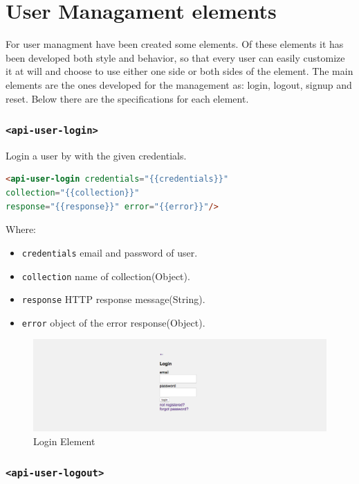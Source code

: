 \section{User Managament elements}

For user managment have been created some elements.
Of these elements it has been developed both style and behavior, so that every user can easily customize it at will and choose to use either one side or both sides of the element.
The main elements are the ones developed for the management as: login, logout, signup and reset.
Below there are the specifications for each element.

\subsubsection{\texttt{<api-user-login>}}

Login a user by with the given credentials.
\begin{lstlisting}[language=html]
<api-user-login credentials="{{credentials}}"
collection="{{collection}}" 
response="{{response}}" error="{{error}}"/>
\end{lstlisting}
Where:
\begin{itemize}
\item \texttt{credentials} email and password of user.
\item \texttt{collection} name of collection(Object).
\item \texttt{response}	HTTP response message(String).
\item \texttt{error} object of the error response(Object).
\end{itemize}

\begin {figure}[h]
\graphicspath{{images/chapter_USR/}}
\includegraphics[width=\textwidth]{usr1}
\caption{Login Element}
\end {figure}

\subsubsection{\texttt{<api-user-logout>}}

